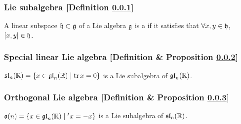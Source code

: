 \subsubsection{Lie subalgebra [Definition \ref{lie-subalgebra}]}\label{lie-subalgebra}
A linear subspace $\mathfrak{h} \subset \mathfrak{g}$ of a Lie algebra $\mathfrak{g}$ is a  if it satisfies that $\forall x, y \in \mathfrak{h}$, $[x,y] \in \mathfrak{h}$.

\subsubsection{Special linear Lie algebra [Definition \& Proposition \ref{special-linear-lie-algebra}]}\label{special-linear-lie-algebra}
$\mathfrak{sl}_n(\mathbb{R}) = \{ x \in \mathfrak{gl}_n(\mathbb{R}) \mid \operatorname{tr} x = 0 \} $ is a Lie subalgebra of $\mathfrak{gl}_n(\mathbb{R})$.

\subsubsection{Orthogonal Lie algebra [Definition \& Proposition \ref{orthogonal-lie-algebra}]}\label{orthogonal-lie-algebra}
$\mathfrak{o}(n) = \{ x \in \mathfrak{gl}_n(\mathbb{R}) \mid {}^tx = -x \}$ is a Lie subalgebra of $\mathfrak{sl}_n(\mathbb{R})$.
